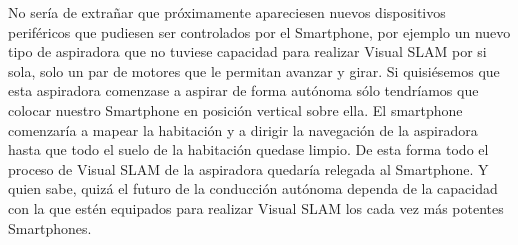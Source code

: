  No sería de extrañar que próximamente apareciesen nuevos dispositivos periféricos que pudiesen ser controlados por el Smartphone, por ejemplo un nuevo tipo de aspiradora que no tuviese capacidad para realizar Visual SLAM por si sola, solo un par de motores que le permitan avanzar y girar. Si quisiésemos que esta aspiradora comenzase a aspirar de forma autónoma sólo tendríamos que colocar nuestro Smartphone en posición vertical sobre ella. El smartphone comenzaría a mapear la habitación y a dirigir la navegación de la aspiradora hasta que todo el suelo de la habitación quedase limpio. De esta forma todo el proceso de Visual SLAM de la aspiradora quedaría relegada al Smartphone. Y quien sabe, quizá el futuro de la conducción autónoma dependa de la capacidad con la que estén equipados para realizar Visual SLAM los cada vez más potentes Smartphones.
